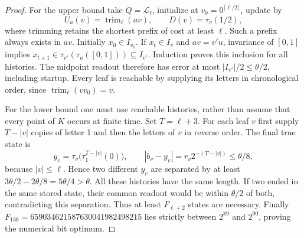 \begin{proof}
For the upper bound take $Q=\mathcal L_\ell$, initialize at
$v_0=0^{\lceil\ell/2\rceil}$, update by
\[
 U_a(v)=\operatorname{trim}_\ell(av),\qquad
 D(v)=\tau_v(1/2),
\]
where trimming retains the shortest prefix of cost at least $\ell$.
Such a prefix always exists in $av$. Initially $x_0\in I_{v_0}$.
If $x_t\in I_v$ and $av=v'u$, invariance of $[0,1]$ implies
$x_{t+1}\in\tau_{v'}(\tau_u([0,1]))\subseteq I_{v'}$.
Induction proves this inclusion for all histories. The midpoint readout
therefore has error at most $|I_{v'}|/2\le\theta/2$, including startup.
Every leaf is reachable by supplying its letters in chronological order,
since $\operatorname{trim}_\ell(vv_0)=v$.

For the lower bound one must use reachable histories, rather than assume
that every point of $K$ occurs at finite time. Set $T=\ell+3$.
For each leaf $v$ first supply $T-|v|$ copies of letter 1 and then the
letters of $v$ in reverse order. The final true state is
\[
 y_v=\tau_v\bigl(\tau_1^{T-|v|}(0)\bigr),\qquad
 |b_v-y_v|=r_v2^{-(T-|v|)}\le\theta/8,
\]
because $|v|\le\ell$. Hence two different $y_v$ are separated by at
least $3\theta/2-2\theta/8=5\theta/4>\theta$.
All these histories have the same length. If two ended in the same
stored state, their common readout would be within $\theta/2$ of both,
contradicting this separation. Thus at least $F_{\ell+2}$ states are
necessary. Finally
$F_{130}=659034621587630041982498215$ lies strictly between $2^{89}$
and $2^{90}$, proving the numerical bit optimum.
\end{proof}
